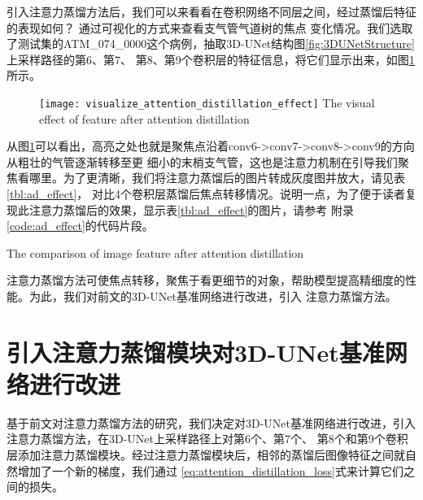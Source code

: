 引入注意力蒸馏方法后，我们可以来看看在卷积网络不同层之间，经过蒸馏后特征的表现如何？ 通过可视化的方式来查看支气管气道树的焦点
变化情况。我们选取了测试集的ATM\_074\_0000这个病例，抽取3D-UNet结构图\ref{fig:3DUNetStructure}上采样路径的第6、第7、
第8、第9个卷积层的特征信息，将它们显示出来，如图\ref{fig:ad_effect}所示。
\begin{figure}[ht]
    \centering
    \texttt{[image: visualize\_attention\_distillation\_effect]}
        {The visual effect of feature after attention distillation}
    \label{fig:ad_effect}
\end{figure}
从图\ref{fig:ad_effect}可以看出，高亮之处也就是聚焦点沿着conv6->conv7->conv8->conv9的方向从粗壮的气管逐渐转移至更
细小的末梢支气管，这也是注意力机制在引导我们聚焦看哪里。为了更清晰，我们将注意力蒸馏后的图片转成灰度图并放大，请见表\ref{tbl:ad_effect}，
对比4个卷积层蒸馏后焦点转移情况。说明一点，为了便于读者复现此注意力蒸馏后的效果，显示表\ref{tbl:ad_effect}的图片，请参考
附录\ref{code:ad_effect}的代码片段。
\begin{table}[!htp]
    \centering
        {The comparison of image feature after attention distillation}
    \label{tbl:ad_effect}
\end{table}

注意力蒸馏方法可使焦点转移，聚焦于看更细节的对象，帮助模型提高精细度的性能。为此，我们对前文的3D-UNet基准网络进行改进，引入
注意力蒸馏方法。

\section{引入注意力蒸馏模块对3D-UNet基准网络进行改进}
基于前文对注意力蒸馏方法的研究，我们决定对3D-UNet基准网络进行改进，引入注意力蒸馏方法，在3D-UNet上采样路径上对第6个、第7个、
第8个和第9个卷积层添加注意力蒸馏模块。经过注意力蒸馏模块后，相邻的蒸馏后图像特征之间就自然增加了一个新的梯度，我们通过
\ref{eq:attention_distillation_loss}式来计算它们之间的损失。

